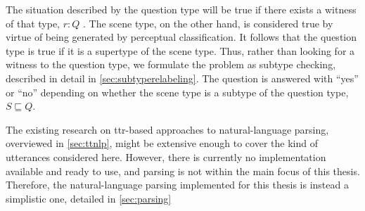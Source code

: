 The situation described by the question type will be true if there exists a witness of that type, $r:Q$ \citep{BarwiseSituationsAttitudes1981,CooperAustiniantruthattitudes2005}.
The scene type, on the other hand, is considered true by virtue of being generated by perceptual classification.
It follows that the question type is true if it is a supertype of the scene type.
Thus, rather than looking for a witness to the question type, we formulate the problem as subtype checking, described in detail in \autoref{sec:subtyperelabeling}.
The question is answered with ``yes'' or ``no'' depending on whether the scene type is a subtype of the question type, $S \sqsubseteq Q$.

The existing research on \gls{ttr}-based approaches to natural-language parsing, overviewed in \autoref{sec:ttnlp}, might be extensive enough to cover the kind of utterances considered here.
However, there is currently no implementation available and ready to use, and parsing is not within the main focus of this thesis.
Therefore, the natural-language parsing implemented for this thesis is instead a simplistic one, detailed in \autoref{sec:parsing}


